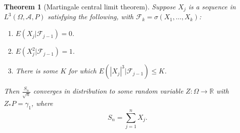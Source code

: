\documentclass{article}
\newtheorem{theorem}{Theorem}
\theoremstyle{definition}
\begin{document}
\begin{theorem}[Martingale central limit theorem]
Suppose $X_j$ is a sequence in $L^3(\Omega,\mathscr{A},P)$ satisfying the following, with
$\mathscr{F}_k=\sigma(X_1,\ldots,X_k)$:
\begin{enumerate}
\item $E(X_{j}|\mathscr{F}_{j-1}) = 0$.\\
\item $E(X_{j}^2| \mathscr{F}_{j-1}) = 1$.\\
\item There is some $K$ for which $E(|X_{j}|^3 | \mathscr{F}_{j-1}) \leq K$.
\end{enumerate}
Then $\frac{S_n}{\sqrt{n}}$ converges in distribution to some random variable $Z:\Omega \to \mathbb{R}$ with
$Z_*P=\gamma_1$, where
\[
S_n = \sum_{j=1}^n X_j.
\]
\end{theorem}
\end{document}
